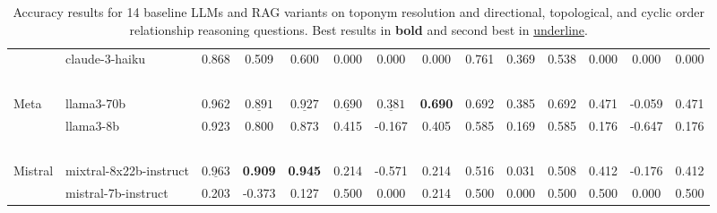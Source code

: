 \begin{table*}[ht]
\begin{tabular}{l|lccc|ccc|ccc|ccc}
        ~       & claude-3-haiku         & 0.868 & 0.509  & 0.600 & 0.000  & 0.000 & 0.000 & 0.761 & 0.369 & 0.538 & 0.000 & 0.000  & 0.000\\ %
        ~       & ~                      & ~ & ~ & ~ & ~  & ~ & ~ & ~ & ~ & ~ & ~  & ~ & ~ \\
        Meta    & llama3-70b             & 0.962 & $\underline{0.891}$  & $\underline{0.927}$ & $\underline{0.690}$ & $\underline{0.381}$  & \textbf{0.690} & 0.692 & 0.385 & 0.692 & 0.471 & -0.059 & 0.471\\ %
        ~       & llama3-8b              & 0.923 & 0.800  & 0.873 & 0.415 & -0.167 & 0.405 & 0.585 & 0.169 & 0.585 & 0.176 & -0.647 & 0.176 \\ %
        ~       & ~                      & ~ & ~ & ~ & ~  & ~ & ~ & ~ & ~ & ~ & ~  & ~ & ~ \\
        Mistral & mixtral-8x22b-instruct & $\underline{0.963}$ & \textbf{0.909}  & \textbf{0.945} & 0.214 & -0.571 & 0.214 & 0.516 & 0.031 & 0.508 & 0.412 & -0.176 & 0.412\\ %
        ~       & mistral-7b-instruct    & 0.203 & -0.373 & 0.127 & 0.500 & 0.000  & 0.214 & 0.500 & 0.000 & 0.500 & 0.500 & 0.000  & 0.500 \\ %
    \hline
    \hline
    \end{tabular}
    \caption{Accuracy results for 14 baseline LLMs and  RAG variants on toponym resolution and directional, topological, and cyclic order relationship reasoning questions. Best results in \textbf{bold} and second best in \underline{underline}.}
    \label{tab:models}
\end{table*}